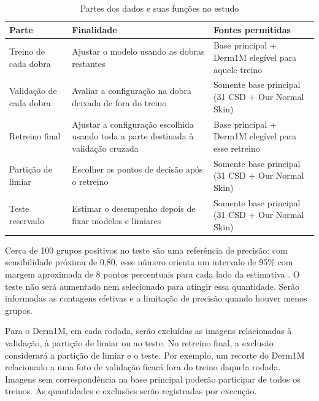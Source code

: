 \begin{table}[H]
	\centering
	\caption{Partes dos dados e suas funções no estudo}
	\label{tab:particoes-estudo}
	\begingroup
	\footnotesize
	\SingleSpacing
	\setlength{\tabcolsep}{4pt}
	\begin{tabular}{|>{\raggedright\arraybackslash}p{3.2cm}|>{\raggedright\arraybackslash}p{6.5cm}|>{\raggedright\arraybackslash}p{4.9cm}|}
		\hline
		\textbf{Parte}          & \textbf{Finalidade}                                                                & \textbf{Fontes permitidas}                          \\ \hline
		Treino de cada dobra    & Ajustar o modelo usando as dobras restantes                                        & Base principal + Derm1M elegível para aquele treino \\ \hline
		Validação de cada dobra & Avaliar a configuração na dobra deixada de fora do treino                          & Somente base principal (31 CSD + Our Normal Skin)   \\ \hline
		Retreino final          & Ajustar a configuração escolhida usando toda a parte destinada à validação cruzada & Base principal + Derm1M elegível para esse retreino \\ \hline
		Partição de limiar      & Escolher os pontos de decisão após o retreino                                      & Somente base principal (31 CSD + Our Normal Skin)   \\ \hline
		Teste reservado         & Estimar o desempenho depois de fixar modelos e limiares                            & Somente base principal (31 CSD + Our Normal Skin)   \\ \hline
	\end{tabular}
	\endgroup
\end{table}

Cerca de 100 grupos positivos no teste são uma referência de precisão:
com sensibilidade próxima de 0,80, esse número orienta um intervalo de 95\%
com margem aproximada de 8 pontos percentuais para cada lado da estimativa
\cite{hajiantilaki2014}. O teste não será aumentado nem selecionado para
atingir essa quantidade. Serão informadas as contagens efetivas e a
limitação de precisão quando houver menos grupos.

Para o Derm1M, em cada rodada, serão excluídas as
imagens relacionadas à validação, à partição de limiar ou ao teste. No
retreino final, a exclusão considerará a partição de limiar e o teste. Por
exemplo, um recorte do Derm1M relacionado a uma foto de validação ficará
fora do treino daquela rodada. Imagens sem correspondência na base
principal poderão participar de todos os treinos. As quantidades e
exclusões serão registradas por execução.

